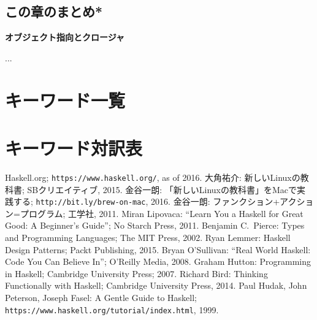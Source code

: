 \documentclass[a5paper,twoside,fleqn,draft]{jsbook}
\newcommand{\programminglanguage}[1]{\textsf{#1}}
\newcommand{\cxx}{\programminglanguage{C}\texttt{++}}
\newenvironment{note}[1]{\begin{boxnote}\begin{center}\textbf{#1}\end{center}}{\end{boxnote}}
\begin{document}
\section{この章のまとめ*}

\begin{note}{オブジェクト指向とクロージャ}
...
\end{note}


\chapter*{キーワード一覧}
\label{ch:keywords}

\chapter*{キーワード対訳表}


\begin{thebibliography}{99}
 Haskell.org;
  \texttt{https://www.haskell.org/}, as of 2016.
 大角祐介: 新しいLinuxの教科書; SBクリエイティブ, 2015.
 金谷一朗: 「新しいLinuxの教科書」をMacで実践する;
  \texttt{http://bit.ly/brew-on-mac}, 2016.
 金谷一朗: ファンクション+アクション=プログラム; 工学社,
  2011.
Miran Lipovaca: ``Learn You a Haskell for Great
  Good: A Beginner's Guide''; No Starch Press, 2011.
 Benjamin C.~Pierce: Types and Programming Languages;
  The MIT Press, 2002.
 Ryan Lemmer: Haskell Design Patterns; Packt
  Publishing, 2015.
 Bryan O'Sullivan: ``Real World Haskell: Code You
  Can Believe In''; O'Reilly Media, 2008.
 Graham Hutton: Programming in Haskell; Cambridge
  University Press; 2007.
 Richard Bird: Thinking Functionally with
  Haskell; Cambridge University Press, 2014.
 Paul Hudak, John Peterson, Joseph Fasel: A Gentle
  Guide to Haskell;
  \texttt{https://www.haskell.org/tutorial/index.html}, 1999.
\end{thebibliography}
\end{document}
